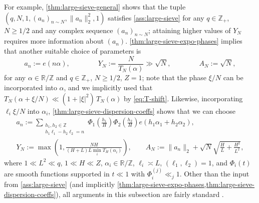\documentclass[reqno,11pt]{amsart}
\theoremstyle{remark}
\numberwithin{equation}{section}
\newcommand{\Z}{\mathbb{Z}}
\newcommand{\R}{\mathbb{R}}
\begin{document}
For example, \cref{thm:large-sieve-general} shows that the tuple $(q, N, 1, (a_n)_{n \sim N}, \|a_n\|_2^2, 1)$ satisfies \cref{ass:large-sieve} for any $q \in \Z_+$, $N \ge 1/2$ and any complex sequence $(a_n)_{n \sim N}$; attaining higher values of $Y_N$ requires more information about $(a_n)$. \cref{thm:large-sieve-expo-phases} implies that another suitable choice of parameters is
\begin{equation} \label{eq:sequence-choice-1}
    a_n := e(n\alpha), \qquad\qquad Y_N := \frac{N}{T_N(\alpha)} \gg \sqrt{N},
    \qquad\qquad A_N := \sqrt{N},
\end{equation}
for any $\alpha \in \R/\Z$ and $q \in \Z_+$, $N \ge 1/2$, $Z = 1$; note that the phase $\xi/N$ can be incorporated into $\alpha$, and we implicitly used that $T_N(\alpha + \xi/N) \ll (1 + |\xi|^2)\, T_N(\alpha)$ by \cref{eq:T-shift}. Likewise, incorporating $\ell_i \xi/N$ into $\alpha_i$, \cref{thm:large-sieve-dispersion-coeffs} shows that we can choose
\begin{equation} \label{eq:sequence-choice-2}
\begin{gathered}
    a_n := 
    \sum_{\substack{h_1, h_2 \in \Z \\ h_1\ell_1 - h_2\ell_2 = n}} \Phi_1\left(\frac{h_1}{H}\right) \Phi_2\left(\frac{h_2}{H}\right) e(h_1\alpha_1 + h_2\alpha_2),
    \\
    Y_N := \max\left(1, \frac{NH}{(H+L)L \min_i T_H(\alpha_i)}\right) 
    ,
    \qquad
    A_N := \|a_n\|_2 + \sqrt{N}\sqrt{\frac{H}{L} + \frac{H^2}{L^2}},
\end{gathered}
\end{equation}
where $1 \ll L^2 \ll q$, $1 \ll H \ll Z$, $\alpha_i \in \R/\Z$, $\ell_i \asymp L$, $(\ell_1, \ell_2) = 1$, and $\Phi_i(t)$ are smooth functions supported in $t \ll 1$ with $\Phi_i^{(j)} \ll_j 1$. Other than the input from \cref{ass:large-sieve} (and implicitly \cref{thm:large-sieve-expo-phases,thm:large-sieve-dispersion-coeffs}), all arguments in this subsection are fairly standard \cite{deshouillers1982kloosterman,drappeau2017sums,de2020niveau}.
\end{document}
